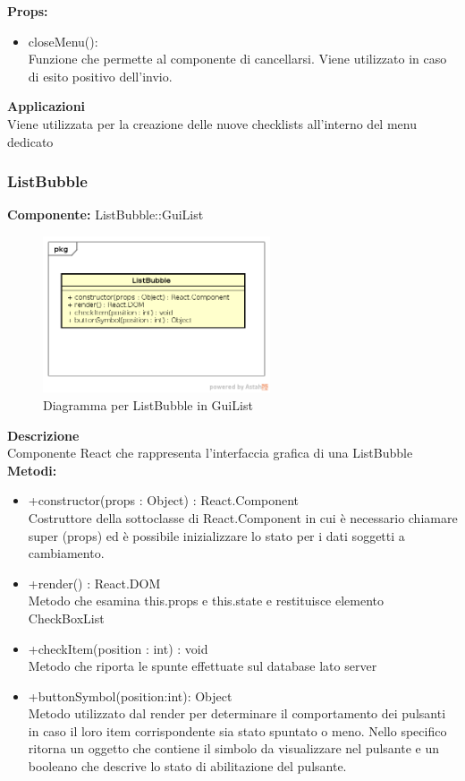 \textbf{Props:} 
\begin{itemize}
\item closeMenu(): 
\\
Funzione che permette al componente di cancellarsi. Viene utilizzato in caso di esito positivo dell'invio.


\end{itemize} 


\textbf{Applicazioni}\\
Viene utilizzata per la creazione delle nuove checklists all'interno del menu dedicato 


\clearpage

\subsubsection{ListBubble}
\textbf{Componente:}  ListBubble::GuiList\\
   \FloatBarrier
   \begin{figure}[ht]
   \centering
   \includegraphics[width=0.6\textwidth]{img/single-ListBubble.png}
   \caption{{Diagramma per ListBubble in GuiList}}
\end{figure}
\FloatBarrier
\textbf{Descrizione}\\
Componente React che rappresenta l'interfaccia grafica di una ListBubble
\\
\textbf{Metodi:} 
\begin{itemize}
\item +constructor(props : Object) : React.Component 
\\
Costruttore della sottoclasse di React.Component in cui è necessario chiamare super (props) ed è possibile inizializzare lo stato per i dati soggetti a cambiamento.

\item +render() : React.DOM 
\\
Metodo che esamina this.props e this.state e restituisce elemento CheckBoxList 

\item +checkItem(position : int) : void 
\\
Metodo che riporta le spunte effettuate sul database lato server

\item +buttonSymbol(position:int): Object
\\
Metodo utilizzato dal render per determinare il comportamento dei pulsanti in caso il loro item corrispondente sia stato spuntato o meno. Nello specifico ritorna un oggetto che contiene il simbolo da visualizzare nel pulsante e un booleano che descrive lo stato di abilitazione del pulsante.

\end{itemize}

